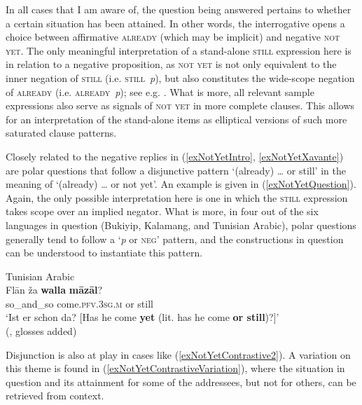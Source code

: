 In all cases that I am aware of, the question being answered pertains to whether a certain situation has been attained. In other words, the interrogative opens a choice between affirmative \textsc{already} (which may be implicit) and negative \textsc{not yet}. The only meaningful interpretation of a stand-alone \textsc{still} expression here is in relation to a negative proposition, as \textsc{not yet} is not only equivalent to the inner negation of \textsc{still} (i.e. \mbox{\textsc{still} \neg\textit{p}}), but also constitutes the wide-scope negation of \textsc{already} (i.e. \mbox{\neg\textsc{already} \textit{p}}); see e.g. \textcite{Loebner1989}. What is more, all relevant sample expressions also serve as signals of \textsc{not yet} in more complete clauses. This allows for an interpretation of the stand-alone items as elliptical versions of such more saturated clause patterns.

Closely related to the negative replies in (\ref{exNotYetIntro}, \ref{exNotYetXavante}) are polar questions that follow a disjunctive pattern \lq (already) …  or still\rq{ }in the meaning of \lq (already) … or not yet\rq{}. An example is given in (\ref{exNotYetQuestion}). Again, the only possible interpretation here is one in which the \textsc{still} expression takes scope over an implied negator. What is more, in four out of the six languages in question (Bukiyip, Kalamang,  and Tunisian Arabic), polar questions generally tend to follow a \lq \textit{p} or \textsc{neg}\rq{ }pattern, and the constructions in question can be understood to instantiate this pattern.

\begin{exe}
		\ex  Tunisian Arabic\label{exNotYetQuestion}\\
		\gll Flān ža \textbf{walla} \textbf{māzāl}?\\
		so\_and\_so come.\textsc{pfv}.3\textsc{sg}.\textsc{m} or still\\
		\glt \lq Ist er schon da? [Has he come \textbf{yet} (lit. has he come \textbf{or still})?]'
		\\(\cite[650]{Singer1984},  glosses added)
\end{exe}

Disjunction is also at play in cases like (\ref{exNotYetContrastive2}). A variation on this theme is found in (\ref{exNotYetContrastiveVariation}), where the situation in question and its attainment for some of the addressees, but not for others, can be retrieved from context.

